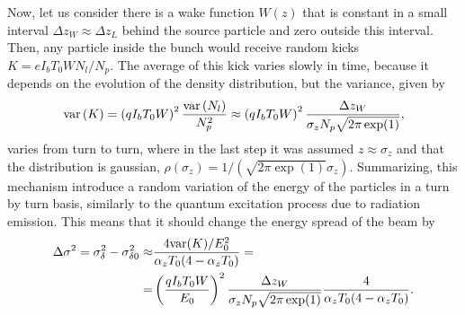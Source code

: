    Now, let us consider there is a wake function $W(z)$ that is constant in a small interval $\Delta z_W \approx \Delta z_L$ behind the source particle and zero outside this interval. Then, any particle inside the bunch would receive random kicks $K = eI_b T_0 W N_l/N_p$. The average of this kick varies slowly in time, because it depends on the evolution of the density distribution, but the variance, given by
    \begin{align}
        \text{var}\left(K\right) = \left(qI_b T_0 W\right)^2 \frac{\text{var}\left(N_l\right)}{N_p^2} \approx
        \left(qI_b T_0 W\right)^2 \frac{\Delta z_W}{\sigma_zN_p\sqrt{2\pi \exp(1)}},
    \end{align}
    varies from turn to turn, where in the last step it was assumed $z \approx \sigma_z$ and that the distribution is gaussian, $\rho(\sigma_z)=1/(\sqrt{2\pi \exp(1)}\sigma_z)$. Summarizing, this mechanism introduce a random variation of the energy of the particles in a turn by turn basis, similarly to the quantum excitation process due to radiation emission. This means that it should change the energy spread of the beam by
    \begin{align}\label{eq:energy_spread_variation}
        \Delta \sigma^2 = \sigma_\delta^2 - \sigma_{\delta0}^2 \approx&
        \frac{4\text{var}(K)/E_0^2}{\alpha_z T_0(4-\alpha_z T_0)} =\nonumber\\
        =&\left(\frac{qI_b T_0 W}{E_0}\right)^2 \frac{\Delta z_W}{\sigma_zN_p\sqrt{2\pi \exp(1)}} \frac{4}{\alpha_z T_0(4-\alpha_z T_0)}.
    \end{align}

